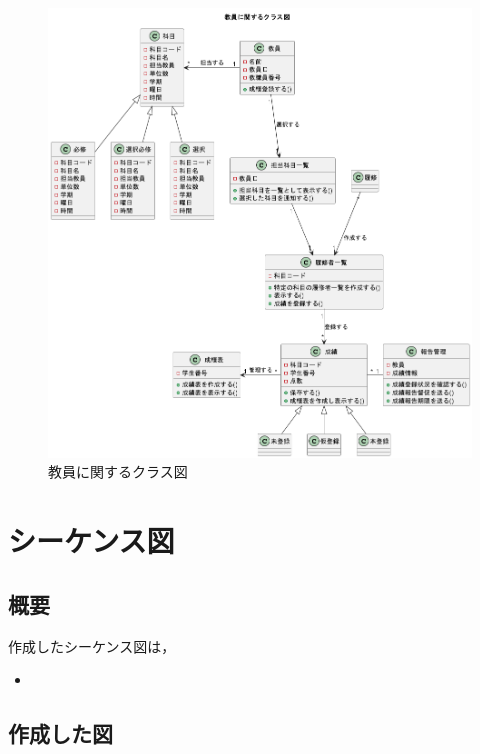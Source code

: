 \documentclass[documentclass]{jsarticle}
\begin{document}
\begin{figure}[H]
  \begin{center}
    \includegraphics*[scale=0.4]{figure/5-4.png}
  \end{center}
  \caption{教員に関するクラス図}
  \label{fig:5-4}
\end{figure}


\newpage

\section{シーケンス図}
\subsection*{概要}
作成したシーケンス図は，
\begin{itemize}
  \item 
\end{itemize}


\subsection*{作成した図}
\end{document}
